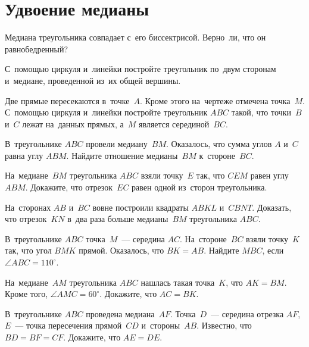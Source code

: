 
\section*{Удвоение медианы}


\begin{problems}

\item
Медиана треугольника совпадает с~его биссектрисой.
Верно~ли, что он равнобедренный?

\item
С~помощью циркуля и~линейки постройте треугольник по~двум сторонам и~медиане,
проведенной из~их общей вершины.

\item
Две прямые пересекаются в~точке~$A$.
Кроме этого на~чертеже отмечена точка~$M$.
С~помощью циркуля и~линейки постройте треугольник $ABC$ такой, что точки~$B$
и~$C$ лежат на~данных прямых, а~$M$ является серединой~$BC$.

\item
В~треугольнике $ABC$ провели медиану~$BM$.
Оказалось, что сумма углов $A$ и~$C$ равна углу $ABM$.
Найдите отношение медианы~$BM$ к~стороне~$BC$.

\item
На~медиане~$BM$ треугольника $ABC$ взяли точку~$E$ так, что $CEM$ равен
углу $ABM$.
Докажите, что отрезок~$EC$ равен одной из~сторон треугольника.

\item
На~сторонах $AB$ и~$BC$ вовне построили квадраты $ABKL$ и~$CBNT$.
Доказать, что отрезок~$KN$ в~два раза больше медианы~$BM$ треугольника $ABC$.

\item
В~треугольнике $ABC$ точка~$M$~--- середина $AC$.
На~стороне~$BC$ взяли точку~$K$ так, что угол $BMK$ прямой.
Оказалось, что $BK = AB$.
Найдите $MBC$, если $\angle ABC =110^{\circ}$.


\item
На~медиане~$AM$ треугольника $ABC$ нашлась такая точка~$K$, что $AK = BM$.
Кроме того, $\angle AMC = 60^{\circ}$.
Докажите, что $AC = BK$.

\item
В~треугольнике $ABC$ проведена медиана~$AF$.
Точка~$D$~--- середина отрезка $AF$, $E$~--- точка пересечения прямой~$CD$
и~стороны~$AB$.
Известно, что $BD = BF = CF$.
Докажите, что $AE = DE$.

\end{problems}

